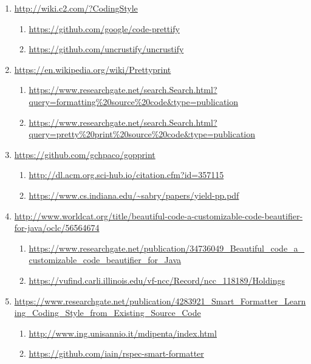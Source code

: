 \begin{englishtext}
\begin{sloppypar}
\begin{bluebox}
\begin{enumerate}[leftmargin=*,parsep=0pt]
    \item \url{http://wiki.c2.com/?CodingStyle}
    \begin{enumerate}[nolistsep,topsep=0pt,label=$\star$]
        \item \url{https://github.com/google/code-prettify}
        \item \url{https://github.com/uncrustify/uncrustify}
    \end{enumerate}

    \item \url{https://en.wikipedia.org/wiki/Prettyprint}
    \begin{enumerate}[nolistsep,topsep=0pt,label=$\star$]
        \item \url{https://www.researchgate.net/search.Search.html?query=formatting%20source%20code&type=publication}
        \item \url{https://www.researchgate.net/search.Search.html?query=pretty%20print%20source%20code&type=publication}
    \end{enumerate}

    \item \url{https://github.com/gchpaco/gopprint}
    \begin{enumerate}[nolistsep,topsep=0pt,label=$\star$]
        \item \url{http://dl.acm.org.sci-hub.io/citation.cfm?id=357115}
        \item \url{https://www.cs.indiana.edu/~sabry/papers/yield-pp.pdf}
    \end{enumerate}

    \item \url{http://www.worldcat.org/title/beautiful-code-a-customizable-code-beautifier-for-java/oclc/56564674}
    \begin{enumerate}[nolistsep,topsep=0pt,label=$\star$]
        \item \url{https://www.researchgate.net/publication/34736049_Beautiful_code_a_customizable_code_beautifier_for_Java}
        \item \url{https://vufind.carli.illinois.edu/vf-ncc/Record/ncc_118189/Holdings}
    \end{enumerate}

    \item \url{https://www.researchgate.net/publication/4283921_Smart_Formatter_Learning_Coding_Style_from_Existing_Source_Code}
    \begin{enumerate}[nolistsep,topsep=0pt,label=$\star$]
        \item \url{http://www.ing.unisannio.it/mdipenta/index.html}
        \item \url{https://github.com/iain/rspec-smart-formatter}
    \end{enumerate}


\end{enumerate}
\end{bluebox}
\end{sloppypar}
\end{englishtext}
